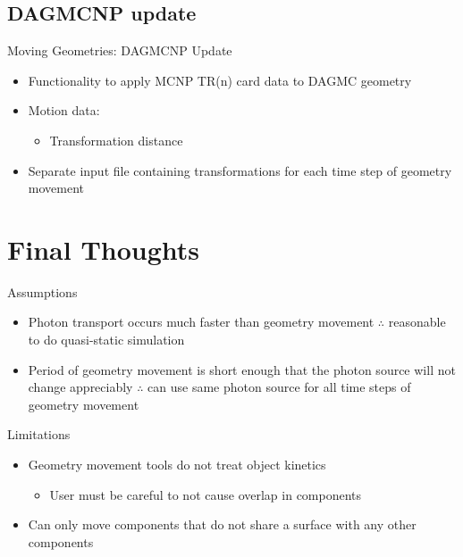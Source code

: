 \documentclass{beamer}
\begin{document}
\subsection{DAGMCNP update}
\begin{frame}{Moving Geometries: DAGMCNP Update}
	\begin{itemize}
		\item{Functionality to apply MCNP TR(n) card data to DAGMC
			geometry}
		\item{Motion data:}
			\begin{itemize}
				\item{Transformation distance}
			\end{itemize}
		\item{Separate input file containing transformations for each
			time step of geometry movement}
	\end{itemize}
\end{frame}


\section{Final Thoughts}
\begin{frame}{Assumptions}
			\begin{itemize}
				\item{Photon transport occurs much faster than
					geometry movement $\therefore$
					reasonable to do quasi-static
					simulation}
				\item{Period of geometry movement is short
					enough that the photon source will not
					change appreciably $\therefore$ can use
					same photon source for all time steps
					of geometry movement}
			\end{itemize}
	\end{frame}
\begin{frame}{Limitations}
\begin{itemize}
\item{Geometry movement tools do not treat object kinetics}
   \begin{itemize}
   \item{User must be careful to not cause overlap in components}
   \end{itemize}
\item{Can only move components that do not share a surface with any other components}
\end{itemize}
\end{frame}
\end{document}
